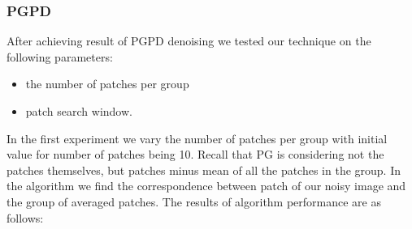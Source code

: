 \subsubsection{PGPD} \label{sc:eva_pgpd}
After achieving result of PGPD denoising we tested our technique on the following parameters:
\begin{itemize}
\item the number of patches per group
\item patch search window. 
\end{itemize}
In the first experiment we vary the number of patches per group with initial value for number of patches being 10. Recall that PG is considering not the patches themselves, but patches minus mean of all the patches in the group. In the algorithm we find the correspondence between patch of our noisy image and the group of averaged patches. The results of algorithm performance are as follows:

